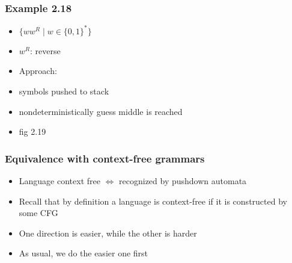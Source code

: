 \begin{frame}[allowframebreaks] \frametitle{Example 2.18}
  \begin{itemize}
\item $\{ww^R\mid w \in \{0,1\}^*\}$

\item [] $w^R$: reverse
\item Approach:

\item [] symbols pushed to stack

\item [] nondeterministically guess middle is reached


\item fig 2.19

\begin{center}
\end{center}

  
\end{itemize}\end{frame} \begin{frame}[allowframebreaks] \frametitle{Equivalence with context-free grammars}
  \begin{itemize}  
\item Language context free
$\Leftrightarrow$ recognized by pushdown automata

\item Recall that by definition a language is context-free if
  it is constructed by some CFG
\item One direction is easier, while the other is harder
\item As usual, we do the easier one first
  

\end{itemize}
\end{frame}
